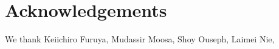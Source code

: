 \documentclass[a4paper,11pt]{article}
\theoremstyle{definition}
\theoremstyle{remark}
\newcommand{\ep}{\epsilon}
\begin{document}










\section*{Acknowledgements}
We thank Keiichiro Furuya, Mudassir Moosa, Shoy Ouseph, Laimei Nie, 


\appendix
\end{document}
